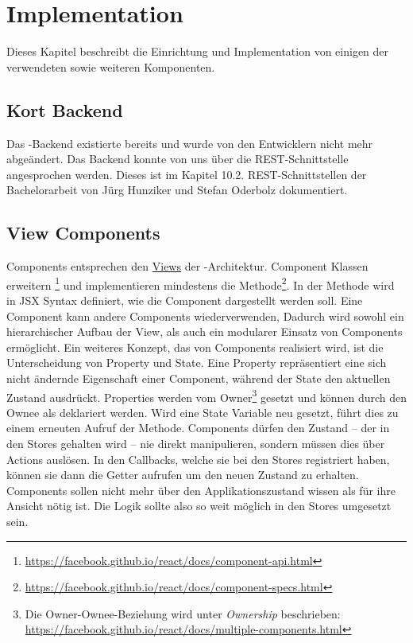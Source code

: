 \chapter{Implementation}
\label{pd-implementation}
Dieses Kapitel beschreibt die Einrichtung und Implementation von einigen der verwendeten  sowie weiteren Komponenten.

\section{Kort Backend}
Das \kort{}-Backend existierte bereits und wurde von den Entwicklern nicht mehr abgeändert. 
Das Backend konnte von uns über die \gls{REST}-Schnittstelle angesprochen werden.
Dieses ist im Kapitel 10.2. REST-Schnittstellen der Bachelorarbeit von Jürg Hunziker und Stefan Oderbolz dokumentiert.\cite{ba-kort-2012}

\section{View Components}
\label{pd-implementation-components}
Components entsprechen den \hyperref[pd-flux-views]{Views} der -Architektur.
Component Klassen erweitern \footnote{\url{https://facebook.github.io/react/docs/component-api.html}} und implementieren mindestens die  Methode\footnote{\url{https://facebook.github.io/react/docs/component-specs.html}}. 
In der  Methode wird in \gls{JSX} Syntax definiert, wie die Component dargestellt werden soll.\newline
Eine Component kann andere Components wiederverwenden,
Dadurch wird sowohl ein hierarchischer Aufbau der View, als auch ein modularer Einsatz von Components  ermöglicht.\newline
Ein weiteres Konzept, das von Components realisiert wird, ist die Unterscheidung von Property und State.
Eine Property repräsentiert eine sich nicht ändernde Eigenschaft einer Component, während der State den aktuellen Zustand ausdrückt.
Properties werden vom Owner\footnote{Die Owner-Ownee-Beziehung wird unter \emph{Ownership} beschrieben: \url{https://facebook.github.io/react/docs/multiple-components.html}} gesetzt und können durch den Ownee als  deklariert werden.
Wird eine State Variable neu gesetzt, führt dies zu einem erneuten Aufruf der  Methode.\newline
Components dürfen den Zustand -- der in den Stores gehalten wird -- nie direkt manipulieren, sondern müssen dies über Actions auslösen.
In den Callbacks, welche sie bei den Stores registriert haben, können sie dann die Getter aufrufen um den neuen Zustand zu erhalten.
Components sollen nicht mehr über den Applikationszustand wissen als für ihre Ansicht nötig ist.
Die Logik sollte also so weit möglich in den Stores umgesetzt sein.\newline


